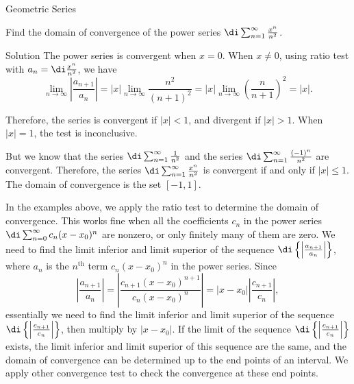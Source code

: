 \begin{example}[label=230305_16]{Geometric Series}
\begin{example}[label=230304_9]{}
\begin{example}[label=230305_3]{}
Find the domain of convergence of the power series $\di \sum_{n=1}^{\infty}\frac{x^n}{n^2}$.
\end{example}
\begin{solution}{Solution}
The power series is convergent when $x=0$. When $x\neq 0$,
  using  ratio test with $a_n=\di \frac{x^n}{n^2}$, we have
\[ \lim_{n\to\infty}\left|\frac{a_{n+1}}{a_n}\right|=|x|\lim_{n\to\infty}\frac{n^2}{(n+1)^2}=|x|\lim_{n\to\infty}\left(\frac{n}{n+1}\right)^2=|x|.\]
 

Therefore, the series is convergent if $|x|<1$, and divergent if $ |x|>1$. When $|x|=1$, the test is inconclusive.

But we know that the series $\di\sum_{n=1}^{\infty}\frac{1}{n^2}$ and the series $\di\sum_{n=1}^{\infty}\frac{(-1)^n}{n^2}$ are convergent. Therefore, the series $\di \sum_{n=1}^{\infty}\frac{x^n}{n^2}$ is convergent if and only if $|x|\leq 1$. The domain of convergence is the set $[-1, 1]$.
 

\end{solution}

In the examples above, we apply the ratio test to determine  the domain of convergence.  This   works fine when all  the coefficients $c_n$ in the power series $
\di\sum_{n=0}^{\infty}c_n(x-x_0)^n$ are nonzero, or only finitely many of them are zero.
We need to find the limit inferior and limit superior of the sequence $\di\left\{\left|\frac{a_{n+1}}{a_n}\right|\right\}$, where $a_n$ is the $n^{\text{th}}$ term $c_n(x-x_0)^n$ in the power series. Since
\[\left|\frac{a_{n+1}}{a_n}\right|=\left|\frac{c_{n+1}(x-x_0)^{n+1}}{c_n(x-x_0)^n}\right|=|x-x_0|\left|\frac{c_{n+1}}{c_n}\right|,\]  essentially we need to find the limit inferior and limit superior of the sequence $\di\left\{\left|\frac{c_{n+1}}{c_n}\right|\right\}$, then multiply by $|x-x_0|$. If the limit of the sequence $\di\left\{\left|\frac{c_{n+1}}{c_n}\right|\right\}$ exists, the limit inferior and limit superior of this sequence are the same, and the domain of convergence can be determined up to the end points of an interval. We apply other convergence test to check the convergence at these end points.



\end{example}
\end{example}
